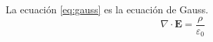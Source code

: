 \documentclass{article}
\begin{document}
La ecuación \eqref{eq:gauss} es la ecuación de Gauss.
\begin{equation}
    \nabla \cdot \mathbf{E} = \frac{\rho}{\varepsilon_0} \label{eq:gauss}
\end{equation}
\end{document}
